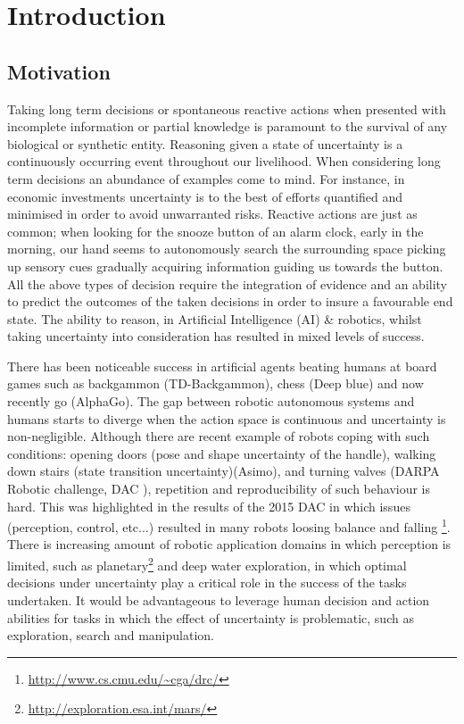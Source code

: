 \chapter{Introduction}

\section{Motivation}


Taking long term decisions or spontaneous reactive actions when presented with incomplete information or partial knowledge is 
paramount to the survival of any biological or synthetic entity. Reasoning given a state of uncertainty is a continuously occurring event throughout our 
livelihood. When considering long term decisions an abundance of examples come to mind. For instance, in economic investments 
uncertainty is to the best of efforts quantified and minimised in order to avoid unwarranted risks. Reactive actions are just as common; 
when looking for the snooze button of an alarm clock, early in the morning, our hand seems to autonomously search the surrounding space picking up
sensory cues gradually acquiring information guiding us towards the button. All the above types of decision require the integration of 
evidence and an ability to predict the outcomes of the taken decisions in order to insure a favourable end state. 
The ability to reason, in Artificial Intelligence (AI) \& robotics, whilst taking uncertainty into consideration has 
resulted in mixed levels of success. 


There has been noticeable success in artificial agents beating humans at board games such as backgammon 
(TD-Backgammon), chess (Deep blue) and now recently go (AlphaGo). The gap between robotic autonomous systems and humans  starts to diverge when the action space is continuous and 
uncertainty is non-negligible. Although there are recent example of robots coping with such conditions: opening doors (pose and shape uncertainty of the handle),
walking down stairs (state transition uncertainty)(Asimo), and turning valves (DARPA Robotic challenge, DAC \cite{DARPA_2015}), repetition and reproducibility of such behaviour 
is hard. This was highlighted in the results of the 2015 DAC in which issues (perception, control, etc...) resulted in many robots
loosing balance and falling \footnote{\url{http://www.cs.cmu.edu/~cga/drc/}}. There is increasing amount of robotic application domains in which 
perception is limited, such as planetary\footnote{\url{http://exploration.esa.int/mars/}} and deep water exploration, in which 
optimal decisions under uncertainty play a critical role in the success of the tasks undertaken. It would be advantageous to leverage
human decision and action abilities for tasks in which the effect of uncertainty is problematic, such as exploration, search and manipulation.

